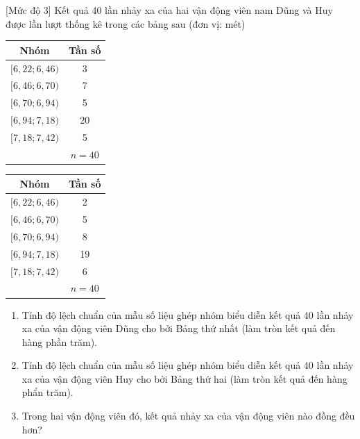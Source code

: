 \begin{bt}%
[Mức độ 3]%
	Kết quả 40 lần nhảy xa của hai vận động viên nam Dũng và Huy được lần lượt thống kê trong các bảng sau (đơn vị: mét)
	\begin{center}
		\begin{tabular}{|c|c|}
			\hline Nhóm & Tần số \\
			\hline$[6{,}22 ; 6{,}46)$ & 3 \\
			{$[6{,}46 ; 6{,}70)$} & 7 \\
			{$[6{,}70 ; 6{,}94)$} & 5 \\
			{$[6{,}94 ; 7{,}18)$} & 20 \\
			{$[7{,}18 ; 7{,}42)$} & 5 \\
			\hline & $n=40$ \\
			\hline
		\end{tabular}
		\begin{tabular}{|c|c|}
			\hline Nhóm & Tần số \\
			\hline$[6{,}22 ; 6{,}46)$ & 2 \\
			{$[6{,}46 ; 6{,}70)$} & 5 \\
			{$[6{,}70 ; 6{,}94)$} & 8 \\
			{$[6{,}94 ; 7{,}18)$} & 19 \\
			{$[7{,}18 ; 7{,}42)$} & 6 \\
			\hline & $n=40$ \\
			\hline
		\end{tabular}
	\end{center}
	\begin{enumerate}
		\item  Tính độ lệch chuẩn của mẫu số liệu ghép nhóm biểu diễn kết quả 40 lần nhảy xa của vận động viên Dũng cho bởi Bảng thứ nhất (làm tròn kết quả đến hàng phần trăm).
		\item Tính độ lệch chuẩn của mẫu số liệu ghép nhóm biểu diễn kết quả 40 lần nhảy xa của vận động viên Huy cho bởi Bảng thứ hai (làm tròn kết quả đến hàng phẩn trăm).
		\item Trong hai vận động viên đó, kết quả nhảy xa của vận động viên nào đồng đều hơn?
	\end{enumerate}
\end{bt}
